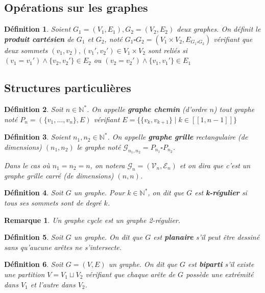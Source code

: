 \documentclass[french,a4paper]{article}
\newtheorem{definition}{Définition}[section]
\newtheorem{remark}{Remarque}[section]
\begin{document}
\subsection{Opérations sur les graphes}
\begin{definition}
Soient $G_1=(V_1,E_1),G_2=(V_2,E_2)$ deux graphes. On définit le \textbf{produit cartésien} de $G_1$ et $G_2$, noté $G_1 \square G_2=(V_1 \times V_2,E_{G_1 \square G_2})$ vérifiant que deux sommets $(v_1,v_2),(v_1',v_2') \in V_1 \times V_2$ sont reliés si $(v_1=v_1') \land \{v_2,v_2'\} \in E_2$ ou $(v_2=v_2') \land \{v_1,v_1'\} \in E_1$
\end{definition}

\subsection{Structures particulières}
\begin{definition}
Soit $n \in \mathbb{N}^*$.
On appelle \textbf{graphe chemin} (d'ordre $n$) tout graphe noté $P_n=(\{v_1,\dots,v_n\},E)$ vérifiant $E=\{\{v_{k},v_{k+1}\} \mid k \in [\![1,n-1]\!]\}$
\end{definition}


\begin{definition}
Soient $n_1,n_2 \in \mathbb{N}^*$.
On appelle \textbf{graphe grille} rectangulaire (de dimensions) $(n_1,n_2)$ le graphe noté $\mathcal{G}_{n_1,n_2}=P_{n_1} \square P_{n_2}$.

Dans le cas où $n_1=n_2=n$, on notera $\mathcal{G}_n=(\mathcal{V}_n,\mathcal{E}_n)$ et on dira que c'est un graphe grille carré (de dimensions) $(n,n)$.
\end{definition}


\begin{definition}
Soit $G$ un graphe.
Pour $k \in \mathbb{N}^*$, on dit que $G$ est \textbf{k-régulier} si tous ses sommets sont de degré $k$.
\end{definition}

\begin{remark}
Un graphe cycle est un graphe 2-régulier.
\end{remark}

\begin{definition}
Soit $G$ un graphe.
On dit que $G$ est \textbf{planaire} s'il peut être dessiné sans qu'aucune arêtes ne s'intersecte.
\end{definition}

\begin{definition}
Soit $G=(V,E)$ un graphe.
On dit que $G$ est \textbf{biparti} s'il existe une partition $V=V_{1} \sqcup V_{2}$ vérifiant que chaque arête de $G$ possède une extrémité dans $V_{1}$ et l'autre dans $V_{2}$.
\end{definition}
\end{document}
